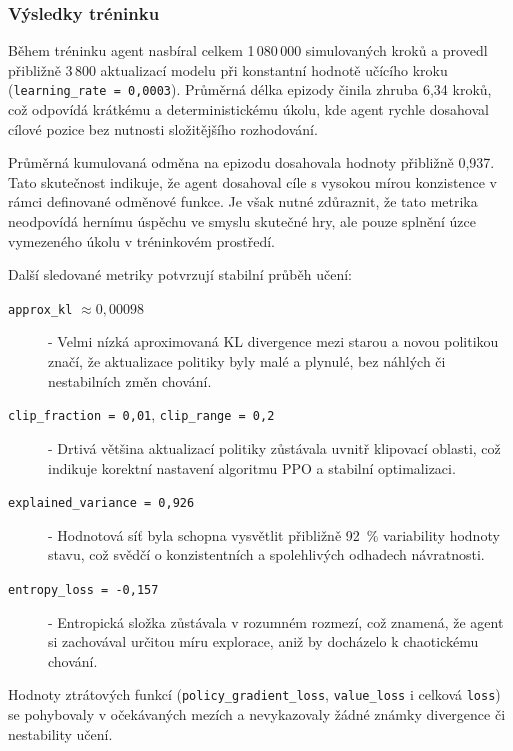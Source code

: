 \subsubsection{Výsledky tréninku}

Během tréninku agent nasbíral celkem 1\,080\,000 simulovaných kroků a provedl přibližně 3\,800 aktualizací modelu při konstantní hodnotě učícího kroku (\texttt{learning\_rate = 0{,}0003}). Průměrná délka epizody činila zhruba 6{,}34 kroků, což odpovídá krátkému a deterministickému úkolu, kde agent rychle dosahoval cílové pozice bez nutnosti složitějšího rozhodování.

Průměrná kumulovaná odměna na epizodu dosahovala hodnoty přibližně 0{,}937. Tato skutečnost indikuje, že agent dosahoval cíle s vysokou mírou konzistence v rámci definované odměnové funkce. Je však nutné zdůraznit, že tato metrika neodpovídá hernímu úspěchu ve smyslu skutečné hry, ale pouze splnění úzce vymezeného úkolu v tréninkovém prostředí.

Další sledované metriky potvrzují stabilní průběh učení:

\begin{description}
    \item[\texttt{approx\_kl} $\approx 0{,}00098$] - Velmi nízká aproximovaná KL divergence mezi starou a novou politikou značí, že aktualizace politiky byly malé a plynulé, bez náhlých či nestabilních změn chování.
    
    \item[\texttt{clip\_fraction = 0{,}01}, \texttt{clip\_range = 0{,}2}] - Drtivá většina aktualizací politiky zůstávala uvnitř klipovací oblasti, což indikuje korektní nastavení algoritmu PPO a stabilní optimalizaci.
    
    \item[\texttt{explained\_variance = 0{,}926}] - Hodnotová síť byla schopna vysvětlit přibližně 92~\% variability hodnoty stavu, což svědčí o konzistentních a spolehlivých odhadech návratnosti.
    
    \item[\texttt{entropy\_loss = -0{,}157}] - Entropická složka zůstávala v rozumném rozmezí, což znamená, že agent si zachovával určitou míru explorace, aniž by docházelo k chaotickému chování.
\end{description}

Hodnoty ztrátových funkcí (\texttt{policy\_gradient\_loss}, \texttt{value\_loss} i celková \texttt{loss}) se pohybovaly v očekávaných mezích a nevykazovaly žádné známky divergence či nestability učení.

